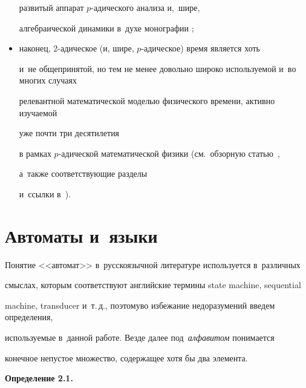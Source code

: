 \begin{multicols}{2}
\begin{itemize}
развитый аппарат $p$-ади\-че\-ско\-го анализа и,~шире,


алгебраической динамики в~духе монографии \cite{AnKhr};


\item наконец, 2-ади\-че\-ское (и, шире, $p$-ади\-че\-ское) время является хоть 


и~не общепринятой, но тем не менее довольно широко используемой и~во многих случаях


релевантной математической моделью физического времени, активно изучаемой


уже почти три десятилетия


в рамках $p$-адической математической физики (см.\  обзорную статью~\cite{DraKhrenVol},


а~также соответствующие разделы


и~ссылки в~\cite{AnKhr}).


\end{itemize}














\section{Автоматы и~языки}







Понятие <<автомат>> в~русскоязычной литературе  используется в~различных


смыслах, которым со\-ответствуют  английские термины state machine, sequential


machine, transducer и~т.\,д., поэтому\linebreak во избежание недоразумений введем определения,


используемые  в~данной работе. Везде далее под~\textit{алфавитом} понимается


конечное непустое множество, содержащее хотя бы два элемента.





\smallskip





\noindent


\textbf{Определение 2.1.}\



\end{multicols}
